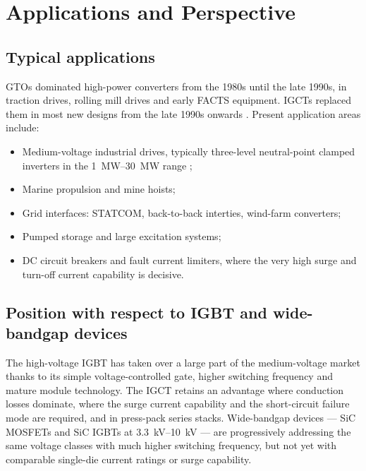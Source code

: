 \section{Applications and Perspective}
\label{gtoigct:ch:applications}

\subsection{Typical applications}

GTOs dominated high-power converters from the 1980s until the late 1990s, in
traction drives, rolling mill drives and early FACTS equipment. IGCTs replaced
them in most new designs from the late 1990s onwards
\cite{steimer1998hardgto,bernet2000}. Present application areas include:

\begin{itemize}[nosep]
  \item Medium-voltage industrial drives, typically three-level neutral-point
        clamped inverters in the \SIrange{1}{30}{\mega\watt} range
        \cite{rodriguez2007multilevel,wu2006};
  \item Marine propulsion and mine hoists;
  \item Grid interfaces: STATCOM, back-to-back interties, wind-farm converters;
  \item Pumped storage and large excitation systems;
  \item DC circuit breakers and fault current limiters, where the very high
        surge and turn-off current capability is decisive.
\end{itemize}

\subsection{Position with respect to IGBT and wide-bandgap devices}

The high-voltage IGBT has taken over a large part of the medium-voltage market
thanks to its simple voltage-controlled gate, higher switching frequency and
mature module technology. The IGCT retains an advantage where conduction losses
dominate, where the surge current capability and the short-circuit failure mode
are required, and in press-pack series stacks. Wide-bandgap devices --- SiC
MOSFETs and SiC IGBTs at \SIrange{3.3}{10}{\kilo\volt} --- are progressively
addressing the same voltage classes with much higher switching frequency, but
not yet with comparable single-die current ratings or surge capability.

